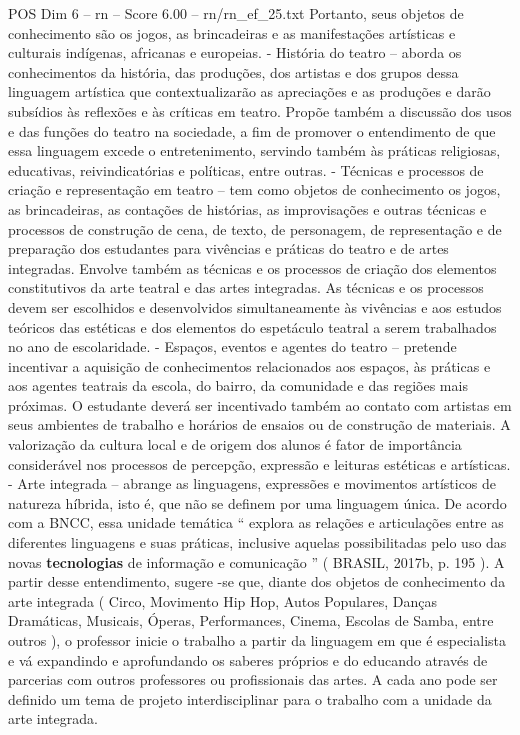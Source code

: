 \begin{textsample}{POS Dim 6 – rn – Score 6.00 – rn/rn\_ef\_25.txt}
Portanto, seus objetos de conhecimento são os jogos, as brincadeiras e as manifestações artísticas e culturais indígenas, africanas e europeias. - História do teatro – aborda os conhecimentos da história, das produções, dos artistas e dos grupos dessa linguagem artística que contextualizarão as apreciações e as produções e darão subsídios às reflexões e às críticas em teatro.
Propõe também a discussão dos usos e das funções do teatro na sociedade, a fim de promover o entendimento de que essa linguagem excede o entretenimento, servindo também às práticas religiosas, educativas, reivindicatórias e políticas, entre outras. - Técnicas e processos de criação e representação em teatro – tem como objetos de conhecimento os jogos, as brincadeiras, as contações de histórias, as improvisações e outras técnicas e processos de construção de cena, de texto, de personagem, de representação e de preparação dos estudantes para vivências e práticas do teatro e de artes integradas.
Envolve também as técnicas e os processos de criação dos elementos constitutivos da arte teatral e das artes integradas.
As técnicas e os processos devem ser escolhidos e desenvolvidos simultaneamente às vivências e aos estudos teóricos das estéticas e dos elementos do espetáculo teatral a serem trabalhados no ano de escolaridade. - Espaços, eventos e agentes do teatro – pretende incentivar a aquisição de conhecimentos relacionados aos espaços, às práticas e aos agentes teatrais da escola, do bairro, da comunidade e das regiões mais próximas.
O estudante deverá ser incentivado também ao contato com artistas em seus ambientes de trabalho e horários de ensaios ou de construção de materiais.
A valorização da cultura local e de origem dos alunos é fator de importância considerável nos processos de percepção, expressão e leituras estéticas e artísticas. - Arte integrada – abrange as linguagens, expressões e movimentos artísticos de natureza híbrida, isto é, que não se definem por uma linguagem única.
De acordo com a BNCC, essa unidade temática “ explora as relações e articulações entre as diferentes linguagens e suas práticas, inclusive aquelas possibilitadas pelo uso das novas \textbf{tecnologias} de informação e comunicação ” ( BRASIL, 2017b, p. 195 ).
A partir desse entendimento, sugere -se que, diante dos objetos de conhecimento da arte integrada ( Circo, Movimento Hip Hop, Autos Populares, Danças Dramáticas, Musicais, Óperas, Performances, Cinema, Escolas de Samba, entre outros ), o professor inicie o trabalho a partir da linguagem em que é especialista e vá expandindo e aprofundando os saberes próprios e do educando através de parcerias com outros professores ou profissionais das artes.
A cada ano pode ser definido um tema de projeto interdisciplinar para o trabalho com a unidade da arte integrada.

\end{textsample}
